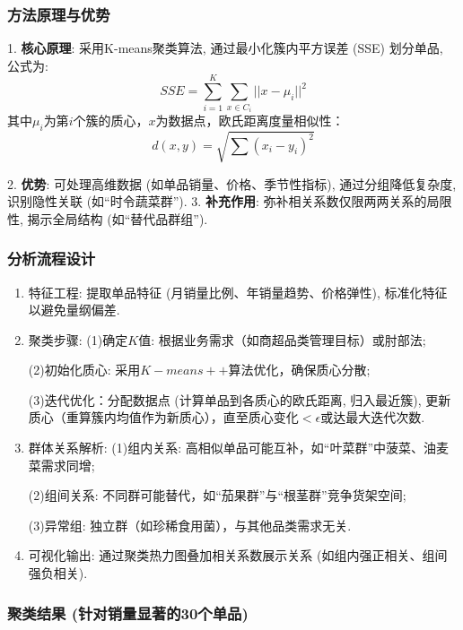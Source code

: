 \documentclass{cumcmthesis}
\begin{document}
\subsubsection{方法原理与优势}

1. \textbf{核心原理}: 采用K-means聚类算法, 通过最小化簇内平方误差 (SSE) 划分单品, 公式为: 
\begin{equation}
SSE=\sum_{i=1}^{K}\sum_{x\in C_i}||x-\mu_i||^2
\end{equation}  
其中$\mu_i$为第$i$个簇的质心，$x$为数据点，欧氏距离度量相似性：  
\begin{equation}
d(x,y)=\sqrt{\sum (x_i-y_i)^2}
\end{equation}

2. \textbf{优势}: 可处理高维数据 (如单品销量、价格、季节性指标), 通过分组降低复杂度, 识别隐性关联 (如“时令蔬菜群”). 
3. \textbf{补充作用}: 弥补相关系数仅限两两关系的局限性, 揭示全局结构 (如“替代品群组”). 

\subsubsection{分析流程设计}

\begin{enumerate}
    \item 特征工程: 提取单品特征 (月销量比例、年销量趋势、价格弹性), 标准化特征以避免量纲偏差. 
    \item 聚类步骤: 
    (1)确定$K$值: 根据业务需求（如商超品类管理目标）或肘部法;

    (2)初始化质心: 采用$K-means++$算法优化，确保质心分散; 

    (3)迭代优化：分配数据点 (计算单品到各质心的欧氏距离, 归入最近簇), 更新质心（重算簇内均值作为新质心），直至质心变化$<\epsilon$或达最大迭代次数. 
    
    \item 群体关系解析: 
    (1)组内关系: 高相似单品可能互补，如“叶菜群”中菠菜、油麦菜需求同增; 

    (2)组间关系: 不同群可能替代，如“茄果群”与“根茎群”竞争货架空间; 

    (3)异常组: 独立群（如珍稀食用菌），与其他品类需求无关. 
    \item 可视化输出: 通过聚类热力图叠加相关系数展示关系 (如组内强正相关、组间强负相关). 
\end{enumerate}

\subsubsection{聚类结果 (针对销量显著的30个单品)}
\end{document}
